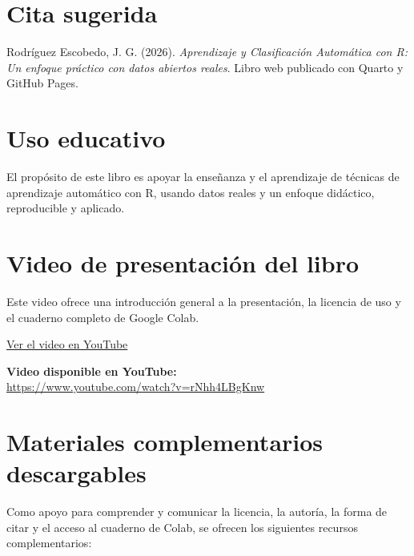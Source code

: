 \documentclass[
  spanish,
  10.5pt,
  letterpaper,
  openany,
  headings=big]{scrbook}
\begin{document}
\section*{Cita sugerida}\label{cita-sugerida}


Rodríguez Escobedo, J. G. (2026). \emph{Aprendizaje y Clasificación
Automática con R: Un enfoque práctico con datos abiertos reales}. Libro
web publicado con Quarto y GitHub Pages.

\section*{Uso educativo}\label{uso-educativo}


El propósito de este libro es apoyar la enseñanza y el aprendizaje de
técnicas de aprendizaje automático con R, usando datos reales y un
enfoque didáctico, reproducible y aplicado.

\section*{Video de presentación del
libro}\label{video-de-presentaciuxf3n-del-libro-1}


Este video ofrece una introducción general a la presentación, la
licencia de uso y el cuaderno completo de Google Colab.

\href{https://www.youtube.com/watch?v=rNhh4LBgKnw}{Ver el video en
YouTube}

\textbf{Video disponible en YouTube:}\\
\url{https://www.youtube.com/watch?v=rNhh4LBgKnw}

\section*{Materiales complementarios
descargables}\label{materiales-complementarios-descargables-1}


Como apoyo para comprender y comunicar la licencia, la autoría, la forma
de citar y el acceso al cuaderno de Colab, se ofrecen los siguientes
recursos complementarios:
\end{document}
